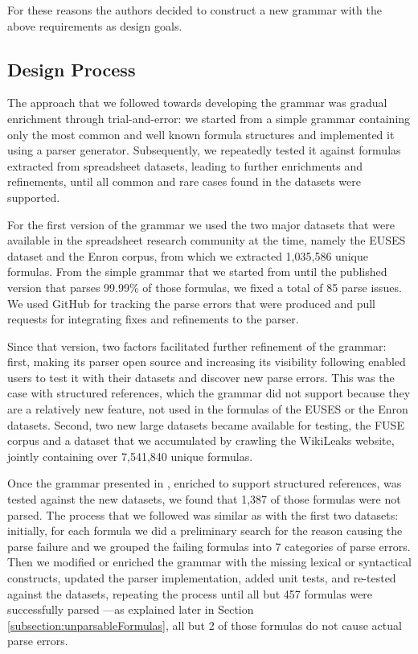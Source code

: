 \documentclass[times]{smrauth}
\begin{document}
For these reasons the authors decided to construct a new grammar with the above requirements as design goals.

\subsection{Design Process}

The approach that we followed towards developing the grammar was gradual enrichment through trial-and-error: we started from a simple grammar containing only the most common and well known formula structures and implemented it using a parser generator. Subsequently, we repeatedly tested it against formulas extracted from spreadsheet datasets, leading to further enrichments and refinements, until all common and rare cases found in the datasets were supported. 

For the first version of the grammar \cite{XLparser} we used the two major datasets that were available in the spreadsheet research community at the time, namely the EUSES dataset \cite{euses} and the Enron \cite{enron} corpus, from which we extracted 1,035,586 unique formulas. From the simple grammar that we started from until the published version that parses 99.99\% of those formulas, we fixed a total of 85 parse issues. We used GitHub for tracking the parse errors that were produced and pull requests for integrating fixes and refinements to the parser.

Since that version, two factors facilitated further refinement of the grammar: first, making its parser open source and increasing its visibility following \cite{XLparser} enabled users to test it with their datasets and discover new parse errors. This was the case with structured references, which the grammar did not support because they are a relatively new feature, not used in the formulas of the EUSES or the Enron datasets. Second, two new large datasets became available for testing, the FUSE corpus \cite{fuse} and a dataset that we accumulated by crawling the WikiLeaks website, jointly containing over 7,541,840 unique formulas.

Once the grammar presented in \cite{XLparser}, enriched to support structured references, was tested against the new datasets, we found that 1,387 of those formulas were not parsed. The process that we followed was similar as with the first two datasets: initially, for each formula we did a preliminary search for the reason causing the parse failure and we grouped the failing formulas into 7 categories of parse errors. Then we modified or enriched the grammar with the missing lexical or syntactical constructs, updated the parser implementation, added unit tests, and re-tested against the datasets, repeating the process until all but 457 formulas were successfully parsed ---as explained later in Section \ref{subsection:unparsableFormulas}, all but 2 of those formulas do not cause actual parse errors.
\end{document}
